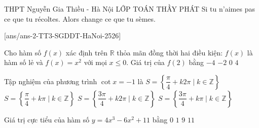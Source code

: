 \begin{name}
	{\tenchude}
	{THPT Nguyễn Gia Thiều - Hà Nội}
	{LỚP TOÁN THẦY PHÁT}
	{Si tu n’aimes pas ce que tu récoltes. Alors change ce que tu sèmes.}
\end{name}

\TN
\setcounter{ex}{0}
[ans/ans-2-TT3-SGDDT-HaNoi-2526]
\begin{ex}%
	Cho hàm số $f(x)$ xác định trên $\mathbb{R}$ thỏa mãn đồng thời hai điều kiện: $f(x)$ là hàm số lẻ và $f(x) = x^2$ với mọi $x \le 0$. Giá trị của $f(2)$ bằng
	\choice
	{\True $-4$}
	{$-2$}
	{$0$}
	{$4$}
\end{ex}
\begin{ex}%
	Tập nghiệm của phương trình $\cot x = -1$ là
	\choice
	{$S = \left\{ \dfrac{\pi}{4} + k2\pi \mid k \in \mathbb{Z} \right\}$}
	{$S = \left\{ \dfrac{\pi}{4} + k\pi \mid k \in \mathbb{Z} \right\}$}
	{$S = \left\{ \dfrac{3\pi}{4} + k2\pi \mid k \in \mathbb{Z} \right\}$}
	{\True $S = \left\{ \dfrac{3\pi}{4} + k\pi \mid k \in \mathbb{Z} \right\}$}
\end{ex}
\begin{ex}%
	Giá trị cực tiểu của hàm số $y = 4x^3 - 6x^2 + 11$ bằng
	\choice
	{$0$}
	{$1$}
	{\True $9$}
	{$11$}
\end{ex}
